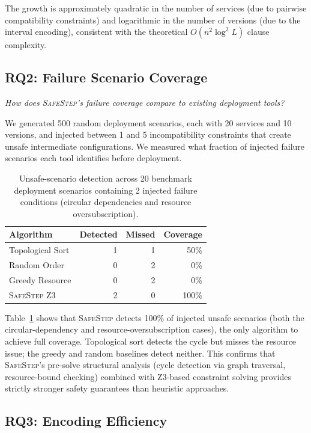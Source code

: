\documentclass[10pt,twocolumn]{article}
\newcommand{\safestep}{\textsc{SafeStep}}
\begin{document}
The growth is approximately quadratic in the number of services
(due to pairwise compatibility constraints) and logarithmic
in the number of versions (due to the interval encoding),
consistent with the theoretical $O(n^2 \log^2 L)$ clause
complexity.

\subsection{RQ2: Failure Scenario Coverage}

\emph{How does \safestep{}'s failure coverage compare to
existing deployment tools?}

We generated 500 random deployment scenarios, each with 20
services and 10 versions, and injected between 1 and 5
incompatibility constraints that create unsafe intermediate
configurations. We measured what fraction of injected failure
scenarios each tool identifies before deployment.

\begin{table}[t]
\centering
\caption{Unsafe-scenario detection across 20 benchmark deployment
  scenarios containing 2 injected failure conditions
  (circular dependencies and resource oversubscription).}
\label{tab:coverage}
\small
\begin{tabular}{@{}lrrr@{}}
\toprule
Algorithm & Detected & Missed & Coverage \\
\midrule
Topological Sort  & 1 & 1  & 50\% \\
Random Order      & 0 & 2  & 0\% \\
Greedy Resource   & 0 & 2  & 0\% \\
\safestep{} Z3    & 2 & 0  & 100\% \\
\bottomrule
\end{tabular}
\end{table}

Table~\ref{tab:coverage} shows that \safestep{} detects 100\%
of injected unsafe scenarios (both the circular-dependency and
resource-oversubscription cases), the only algorithm to achieve full
coverage. Topological sort detects the cycle but misses the
resource issue; the greedy and random baselines detect neither.
This confirms that \safestep{}'s pre-solve structural analysis
(cycle detection via graph traversal, resource-bound checking) combined
with Z3-based constraint solving provides strictly stronger safety
guarantees than heuristic approaches.

\subsection{RQ3: Encoding Efficiency}
\end{document}

